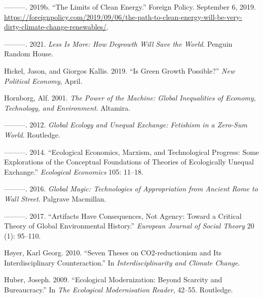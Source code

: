 \documentclass[a4paper, nobind]{templates/ociamthesis}
\newlength{\cslhangindent}
\newenvironment{CSLReferences}[2] %
 {%
  \setlength{\parindent}{0pt}
  \ifodd #1
  \let\oldpar\par
  \def\par{\hangindent=\cslhangindent\oldpar}
  \fi
  \setlength{\parskip}{1mm}
  \setlength{\baselineskip}{6mm}
 }%
 {}
\begin{document}
\begin{CSLReferences}{1}{0}
\leavevmode{}%
---------. 2019b. {``The {Limits} of {Clean Energy}.''} {Foreign Policy}. September 6, 2019. \url{https://foreignpolicy.com/2019/09/06/the-path-to-clean-energy-will-be-very-dirty-climate-change-renewables/}.

\leavevmode{}%
---------. 2021. \emph{Less {Is More}: {How Degrowth Will Save} the {World}}. {Penguin Random House}.

\leavevmode{}%
Hickel, Jason, and Giorgos Kallis. 2019. {``Is {Green Growth Possible}?''} \emph{New Political Economy}, April.

\leavevmode{}%
Hornborg, Alf. 2001. \emph{The {Power} of the {Machine}: {Global Inequalities} of {Economy}, {Technology}, and {Environment}}. {Altamira}.

\leavevmode{}%
---------. 2012. \emph{Global {Ecology} and {Unequal Exchange}: {Fetishism} in a {Zero-Sum World}}. {Routledge}.

\leavevmode{}%
---------. 2014. {``Ecological Economics, {Marxism}, and Technological Progress: {Some} Explorations of the Conceptual Foundations of Theories of Ecologically Unequal Exchange.''} \emph{Ecological Economics} 105: 11--18.

\leavevmode{}%
---------. 2016. \emph{Global {Magic}: {Technologies} of {Appropriation} from {Ancient Rome} to {Wall Street}}. {Palgrave Macmillan}.

\leavevmode{}%
---------. 2017. {``Artifacts Have Consequences, Not Agency: {Toward} a Critical Theory of Global Environmental History.''} \emph{European Journal of Social Theory} 20 (1): 95--110.

\leavevmode{}%
Høyer, Karl Georg. 2010. {``Seven Theses on {CO2-reductionism} and Its Interdisciplinary Counteraction.''} In \emph{Interdisciplinarity and {Climate Change}}.

\leavevmode{}%
Huber, Joseph. 2009. {``Ecological Modernization: {Beyond} Scarcity and Bureaucracy.''} In \emph{The {Ecological Modernisation Reader}}, 42--55. {Routledge}.


\end{CSLReferences}
\end{document}
